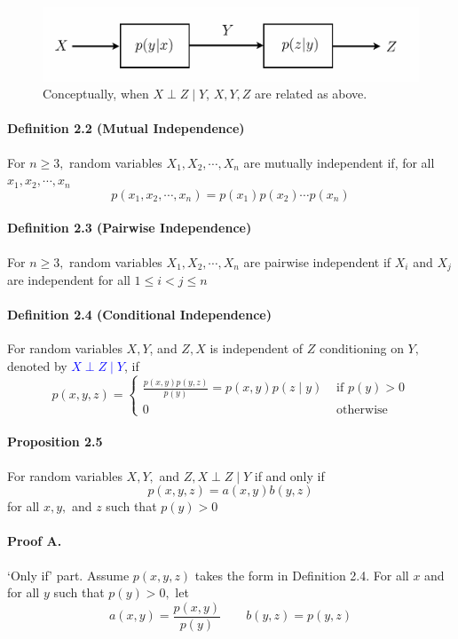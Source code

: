 \documentclass[8pt]{article}
\begin{document}
\begin{figure}[!h]
    \centering
    \includegraphics[width=0.5\linewidth]{imgs/def2_4.png}
    \caption{Conceptually, when $X \perp Z \mid Y$, $X, Y, Z$ are related as above.}
    \label{fig:my_label}
\end{figure}
\begin{tcolorbox}
\paragraph{Definition 2.2 (Mutual Independence)} For $n \geq 3,$ random variables $X_{1}, X_{2}, \cdots, X_{n}$ are mutually independent if, for all $x_{1}, x_{2}, \cdots, x_{n}$
$$
p\left(x_{1}, x_{2}, \cdots, x_{n}\right)=p\left(x_{1}\right) p\left(x_{2}\right) \cdots p\left(x_{n}\right)
$$
\paragraph{Definition 2.3 (Pairwise Independence)} For $n \geq 3,$ random variables $X_{1}, X_{2}, \cdots, X_{n}$ are pairwise independent if $X_{i}$ and $X_{j}$ are independent for all $1 \leq i<j \leq n$
\\
\paragraph{Definition 2.4 (Conditional Independence)} For random variables $X, Y$, and $Z, X$ is independent of $Z$ conditioning on $Y,$ denoted by \textcolor{blue}{$X \perp Z \mid Y$}, if
$$
p(x, y, z)=\left\{\begin{array}{cc}
\frac{p(x, y) p(y, z)}{p(y)}=p(x, y) p(z \mid y) & \text { if } p(y)>0 \\
0 & \text { otherwise }
\end{array}\right.
$$

\paragraph{Proposition 2.5} For random variables $X, Y,$ and $Z, X \perp Z \mid Y$ if and only if
$$
p(x, y, z)=a(x, y) b(y, z)
$$
for all $x, y,$ and $z$ such that $p(y)>0$

\end{tcolorbox}

\paragraph{Proof A.} `Only if' part. Assume $p(x, y, z)$ takes the form in Definition 2.4. For all $x$ and for all $y$ such that $p(y)>0,$ let
$$
a(x, y)=\frac{p(x, y)}{p(y)}
\quad \quad
b(y, z)=p(y, z)
$$
\end{document}
